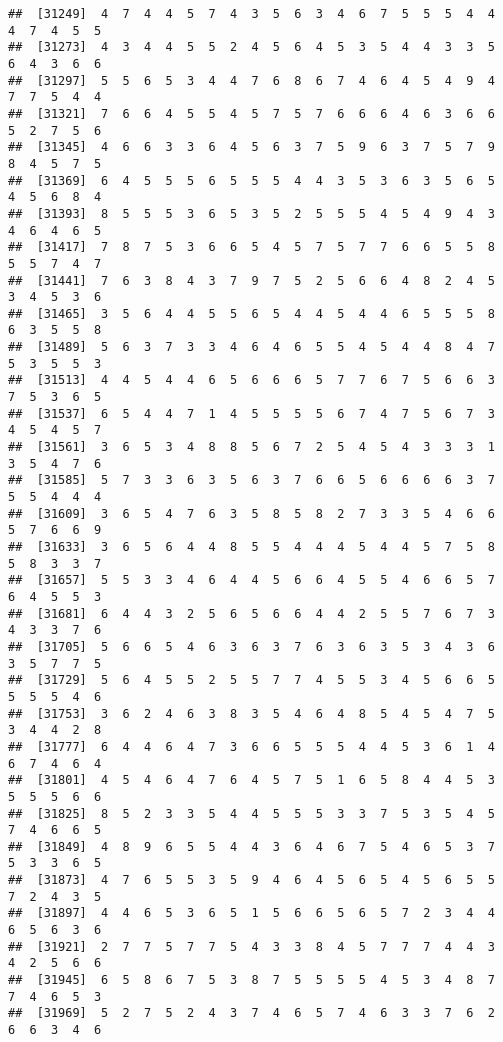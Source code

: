\documentclass[
]{book}
\begin{document}
\begin{verbatim}
##  [31249]  4  7  4  4  5  7  4  3  5  6  3  4  6  7  5  5  5  4  4  4  7  4  5  5
##  [31273]  4  3  4  4  5  5  2  4  5  6  4  5  3  5  4  4  3  3  5  6  4  3  6  6
##  [31297]  5  5  6  5  3  4  4  7  6  8  6  7  4  6  4  5  4  9  4  7  7  5  4  4
##  [31321]  7  6  6  4  5  5  4  5  7  5  7  6  6  6  4  6  3  6  6  5  2  7  5  6
##  [31345]  4  6  6  3  3  6  4  5  6  3  7  5  9  6  3  7  5  7  9  8  4  5  7  5
##  [31369]  6  4  5  5  5  6  5  5  5  4  4  3  5  3  6  3  5  6  5  4  5  6  8  4
##  [31393]  8  5  5  5  3  6  5  3  5  2  5  5  5  4  5  4  9  4  3  4  6  4  6  5
##  [31417]  7  8  7  5  3  6  6  5  4  5  7  5  7  7  6  6  5  5  8  5  5  7  4  7
##  [31441]  7  6  3  8  4  3  7  9  7  5  2  5  6  6  4  8  2  4  5  3  4  5  3  6
##  [31465]  3  5  6  4  4  5  5  6  5  4  4  5  4  4  6  5  5  5  8  6  3  5  5  8
##  [31489]  5  6  3  7  3  3  4  6  4  6  5  5  4  5  4  4  8  4  7  5  3  5  5  3
##  [31513]  4  4  5  4  4  6  5  6  6  6  5  7  7  6  7  5  6  6  3  7  5  3  6  5
##  [31537]  6  5  4  4  7  1  4  5  5  5  5  6  7  4  7  5  6  7  3  4  5  4  5  7
##  [31561]  3  6  5  3  4  8  8  5  6  7  2  5  4  5  4  3  3  3  1  3  5  4  7  6
##  [31585]  5  7  3  3  6  3  5  6  3  7  6  6  5  6  6  6  6  3  7  5  5  4  4  4
##  [31609]  3  6  5  4  7  6  3  5  8  5  8  2  7  3  3  5  4  6  6  5  7  6  6  9
##  [31633]  3  6  5  6  4  4  8  5  5  4  4  4  5  4  4  5  7  5  8  5  8  3  3  7
##  [31657]  5  5  3  3  4  6  4  4  5  6  6  4  5  5  4  6  6  5  7  6  4  5  5  3
##  [31681]  6  4  4  3  2  5  6  5  6  6  4  4  2  5  5  7  6  7  3  4  3  3  7  6
##  [31705]  5  6  6  5  4  6  3  6  3  7  6  3  6  3  5  3  4  3  6  3  5  7  7  5
##  [31729]  5  6  4  5  5  2  5  5  7  7  4  5  5  3  4  5  6  6  5  5  5  5  4  6
##  [31753]  3  6  2  4  6  3  8  3  5  4  6  4  8  5  4  5  4  7  5  3  4  4  2  8
##  [31777]  6  4  4  6  4  7  3  6  6  5  5  5  4  4  5  3  6  1  4  6  7  4  6  4
##  [31801]  4  5  4  6  4  7  6  4  5  7  5  1  6  5  8  4  4  5  3  5  5  5  6  6
##  [31825]  8  5  2  3  3  5  4  4  5  5  5  3  3  7  5  3  5  4  5  7  4  6  6  5
##  [31849]  4  8  9  6  5  5  4  4  3  6  4  6  7  5  4  6  5  3  7  5  3  3  6  5
##  [31873]  4  7  6  5  5  3  5  9  4  6  4  5  6  5  4  5  6  5  5  7  2  4  3  5
##  [31897]  4  4  6  5  3  6  5  1  5  6  6  5  6  5  7  2  3  4  4  6  5  6  3  6
##  [31921]  2  7  7  5  7  7  5  4  3  3  8  4  5  7  7  7  4  4  3  4  2  5  6  6
##  [31945]  6  5  8  6  7  5  3  8  7  5  5  5  5  4  5  3  4  8  7  7  4  6  5  3
##  [31969]  5  2  7  5  2  4  3  7  4  6  5  7  4  6  3  3  7  6  2  6  6  3  4  6

\end{verbatim}
\end{document}
